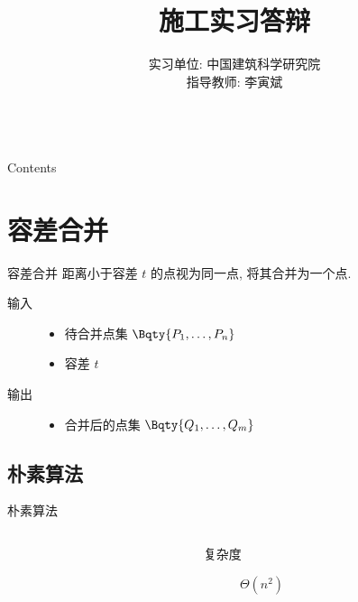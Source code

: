 \documentclass[lang = zh]{ibeamer}
\author{
  实习单位: 中国建筑科学研究院 \\
  指导教师: 李寅斌 \\
  \thename \quad \theid \quad \theclass \\
}
\title{施工实习答辩}
\begin{document}
\frame{\titlepage}

\begin{frame}{Contents}
  \tableofcontents
\end{frame}

\section{容差合并}

\begin{frame}{容差合并}
  距离小于容差 $t$ 的点视为同一点, 将其合并为一个点.
  \begin{description}
    \item[输入]
      \begin{itemize}
        \item 待合并点集 $\Bqty{P_1, \dots, P_n}$
        \item 容差 $t$
      \end{itemize}
    \item[输出]
      \begin{itemize}
        \item 合并后的点集 $\Bqty{Q_1, \dots, Q_m}$
      \end{itemize}
  \end{description}
\end{frame}

\subsection{朴素算法}

\begin{frame}{朴素算法}
  \begin{columns}
    \begin{column}{0.7 \linewidth}
    \end{column}
    \begin{column}{0.3 \linewidth}
      \begin{description}
        \item[复杂度] $\Theta(n^2)$
      \end{description}
    \end{column}
  \end{columns}
\end{frame}
\end{document}
